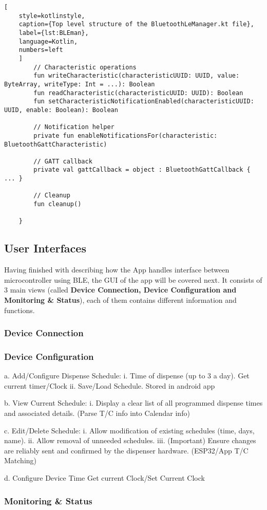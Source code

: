 \begin{lstlisting}[
	style=kotlinstyle,
	caption={Top level structure of the BluetoothLeManager.kt file},
	label={lst:BLEman},
	language=Kotlin,
	numbers=left
	]
		// Characteristic operations
		fun writeCharacteristic(characteristicUUID: UUID, value: ByteArray, writeType: Int = ...): Boolean
		fun readCharacteristic(characteristicUUID: UUID): Boolean
		fun setCharacteristicNotificationEnabled(characteristicUUID: UUID, enable: Boolean): Boolean
		
		// Notification helper
		private fun enableNotificationsFor(characteristic: BluetoothGattCharacteristic)
		
		// GATT callback
		private val gattCallback = object : BluetoothGattCallback { ... }
		
		// Cleanup
		fun cleanup()
		
	}
\end{lstlisting}

\subsection{User Interfaces}
Having finished with describing how the App handles interface between microcontroller using \ac{BLE}, the \ac{GUI} of the app will be covered next. It consists of 3 main views (called \textbf{Device Connection, Device Configuration and Monitoring \&  Status}), each of them contains different information and functions.
\subsubsection{Device Connection}

\subsubsection{Device Configuration}
  a. Add/Configure Dispense Schedule:
  i. Time of dispense (up to 3 a day). Get current timer/Clock
  ii. Save/Load Schedule. Stored in android app
  
  b. View Current Schedule:
  i. Display a clear list of all programmed dispense times and associated details. (Parse T/C info into Calendar info)
  
  c. Edit/Delete Schedule:
  i. Allow modification of existing schedules (time, days, name).
  ii. Allow removal of unneeded schedules.
  iii. (Important) Ensure changes are reliably sent and confirmed by the dispenser hardware. (ESP32/App T/C Matching)
  
  d. Configure Device Time Get current Clock/Set Current Clock
  
\subsubsection{Monitoring \&  Status}

